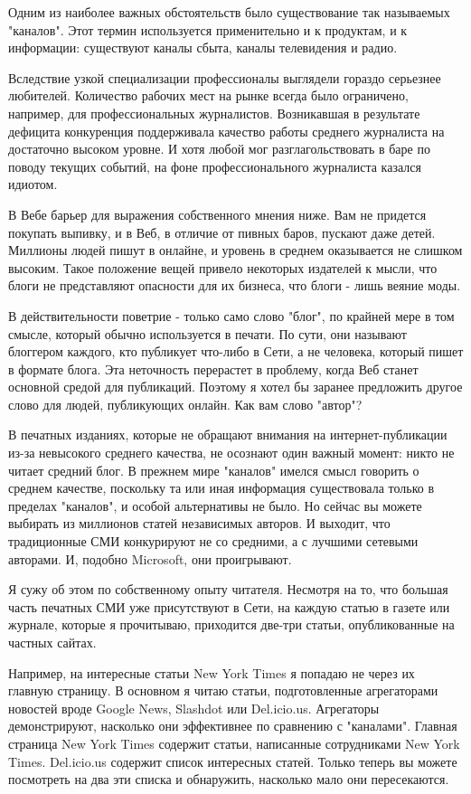 \documentclass[ebook,12pt,oneside,openany]{memoir}
\begin{document}
Одним из наиболее важных обстоятельств было существование так
называемых "каналов". Этот термин используется применительно и к
продуктам, и к информации: существуют каналы сбыта, каналы телевидения
и радио.

Вследствие узкой специализации профессионалы выглядели гораздо
серьезнее любителей. Количество рабочих мест на рынке всегда было
ограничено, например, для профессиональных журналистов. Возникавшая в
результате дефицита конкуренция поддерживала качество работы среднего
журналиста на достаточно высоком уровне. И хотя любой мог
разглагольствовать в баре по поводу текущих событий, на фоне
профессионального журналиста казался идиотом.

В Вебе барьер для выражения собственного мнения ниже. Вам не придется
покупать выпивку, и в Веб, в отличие от пивных баров, пускают даже
детей. Миллионы людей пишут в онлайне, и уровень в среднем оказывается
не слишком высоким. Такое положение вещей привело некоторых издателей
к мысли, что блоги не представляют опасности для их бизнеса, что блоги
- лишь веяние моды.

В действительности поветрие - только само слово "блог", по крайней
мере в том смысле, который обычно используется в печати. По сути, они
называют блоггером каждого, кто публикует что-либо в Сети, а не
человека, который пишет в формате блога. Эта неточность перерастет в
проблему, когда Веб станет основной средой для публикаций. Поэтому я
хотел бы заранее предложить другое слово для людей, публикующих
онлайн. Как вам слово "автор"?

В печатных изданиях, которые не обращают внимания на
интернет-публикации из-за невысокого среднего качества, не осознают
один важный момент: никто не читает средний блог. В прежнем мире
"каналов" имелся смысл говорить о среднем качестве, поскольку та или
иная информация существовала только в пределах "каналов", и особой
альтернативы не было. Но сейчас вы можете выбирать из миллионов статей
независимых авторов. И выходит, что традиционные СМИ конкурируют не со
средними, а с лучшими сетевыми авторами. И, подобно Microsoft, они
проигрывают.

Я сужу об этом по собственному опыту читателя. Несмотря на то, что
большая часть печатных СМИ уже присутствуют в Сети, на каждую статью в
газете или журнале, которые я прочитываю, приходится две-три статьи,
опубликованные на частных сайтах.

Например, на интересные статьи New York Times я попадаю не через их
главную страницу. В основном я читаю статьи, подготовленные
агрегаторами новостей вроде Google News, Slashdot или Del.icio.us.
Агрегаторы демонстрируют, насколько они эффективнее по сравнению с
"каналами". Главная страница New York Times содержит статьи,
написанные сотрудниками New York Times. Del.icio.us содержит список
интересных статей. Только теперь вы можете посмотреть на два эти
списка и обнаружить, насколько мало они пересекаются.
\end{document}
